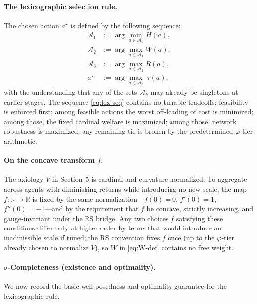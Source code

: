 \documentclass[11pt]{article}
\begin{document}
\paragraph{The lexicographic selection rule.}
The chosen action $a^\star$ is defined by the following sequence:
\begin{equation}
\label{eq:lex-seq}
\begin{aligned}
\mathcal{A}_1 &:= \arg\min_{a\in\mathcal{A}_\sigma} H(a),
\\
\mathcal{A}_2 &:= \arg\max_{a\in\mathcal{A}_1} W(a),
\\
\mathcal{A}_3 &:= \arg\max_{a\in\mathcal{A}_2} R(a),
\\
a^\star &:= \arg\max_{a\in\mathcal{A}_3} \ \tau(a),
\end{aligned}
\end{equation}
with the understanding that any of the sets $\mathcal{A}_k$ may already be singletons at earlier stages. The sequence \eqref{eq:lex-seq} contains no tunable tradeoffs: feasibility is enforced first; among feasible actions the worst off‑loading of cost is minimized; among those, the fixed cardinal welfare is maximized; among those, network robustness is maximized; any remaining tie is broken by the predetermined $\varphi$‑tier arithmetic.

\paragraph{On the concave transform $f$.}
The axiology $V$ in Section~5 is cardinal and curvature‑normalized. To aggregate across agents with diminishing returns while introducing no new scale, the map $f:\mathbb{R}\to\mathbb{R}$ is fixed by the same normalization—$f(0)=0$, $f'(0)=1$, $f''(0)=-1$—and by the requirement that $f$ be concave, strictly increasing, and gauge‑invariant under the RS bridge. Any two choices $f$ satisfying these conditions differ only at higher order by terms that would introduce an inadmissible scale if tuned; the RS convention fixes $f$ once (up to the $\varphi$‑tier already chosen to normalize $V$), so $W$ in \eqref{eq:W-def} contains no free weight.

\paragraph{$\sigma$-Completeness (existence and optimality).}
We now record the basic well‑posedness and optimality guarantee for the lexicographic rule.
\end{document}
